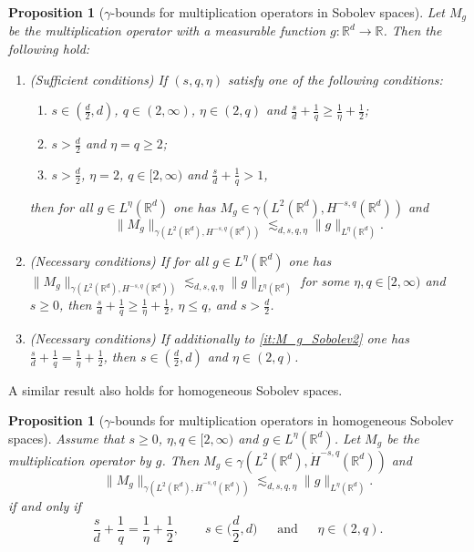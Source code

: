 \documentclass[reqno]{amsart}
\theoremstyle{plain}
\theoremstyle{remark}
\theoremstyle{plain}
\newtheorem{proposition}[theorem]{Proposition}
\numberwithin{equation}{section}
\def\R{{\mathbb R}}
\newcommand{\g}{\gamma}
\newcommand{\1}{\one}
\begin{document}
\begin{proposition}[$\gamma$-bounds for multiplication operators in Sobolev spaces]
\label{prop:M_g_Sobolev}
Let $M_g$ be the multiplication operator with a measurable function $g:\R^d \to \R$. 
Then the following hold:
\begin{enumerate}[{\rm(1)}]
\item\label{it:M_g_Sobolev1} {\rm (Sufficient conditions)}
If $(s,q,\eta)$ satisfy one of the following conditions:
\begin{enumerate}[{\rm(a)}]
\item\label{it:M_g_Sobolev1a}
$s\in(\frac{d}{2},d)$, $ q\in (2, \infty)$, $\eta\in (2, q)$ and $\frac{s}{d} + \frac{1}{q}  \geq \frac{1}{\eta} + \frac{1}{2}$;
\item\label{it:M_g_Sobolev1b} 
$s>\frac{d}{2}$ and $\eta=q\geq 2$;

\item\label{it:M_g_Sobolev1c}
$s>\frac{d}{2}$, $\eta=2$, $q\in [2,\infty)$ and $\frac{s}{d} + \frac{1}{q} > 1$,
\end{enumerate}
then for all $g\in L^\eta(\R^d)$ one has $M_g\in \g(L^2(\R^d),H^{-s,q}(\R^d))$ and 
\[
\|M_g\|_{\gamma(L^2(\R^d), H^{-s,q}(\R^d))} 
\lesssim_{d,s,q,\eta} \|g\|_{L^\eta(\R^d)}.
\]
%
\item\label{it:M_g_Sobolev2} {\rm (Necessary conditions)} If for all $g\in L^{\eta}(\R^d)$ one has $\|M_g\|_{\gamma(L^2(\R^d), H^{-s,q}(\R^d))} 
\lesssim_{d,s,q,\eta} \|g\|_{L^\eta(\R^d)}
$
for some $\eta,q\in [2,\infty)$ and $s\geq 0$, then 
$\frac{s}{d}+\frac{1}{q}\geq \frac{1}{\eta}+\frac{1}{2}$, $\eta\leq q$, and $s>\frac{d}{2}$.
\item\label{it:M_g_Sobolev3} {\rm (Necessary conditions)} If additionally to \eqref{it:M_g_Sobolev2} one has $\frac{s}{d}+\frac{1}{q}= \frac{1}{\eta}+\frac{1}{2}$, then $s\in (\frac{d}{2},d)$ and $\eta\in (2,q)$.
\end{enumerate}
\end{proposition}

A similar result also holds for homogeneous Sobolev spaces.


\begin{proposition}[$\gamma$-bounds for multiplication operators in homogeneous Sobolev spaces]
\label{prop:M_g_Sobolev_hom} 
Assume that $s\geq 0$, $\eta,q\in [2,\infty)$ and $g\in L^\eta(\R^d)$. 
Let $M_g$ be the multiplication operator by $g$.  
Then $M_g\in \g(L^2(\R^d), \dot{H}^{-s,q}(\R^d))$ and 
\[
\|M_g\|_{\gamma(L^2(\R^d), \dot{H}^{-s,q}(\R^d))} 
\lesssim_{d,s,q,\eta} \|g\|_{L^\eta(\R^d)}.
\]
if and only if 
\begin{equation}
\label{eq:conditions_parameters_homogeneous_gamma}
\frac{s}{d}+\frac{1}{q}= \frac{1}{\eta}+\frac{1}{2} , \qquad s\in \Big(\frac{d}{2},d\Big) \ \quad \text{ and }\quad \  \eta\in (2,q).
\end{equation}
\end{proposition}
\end{document}
